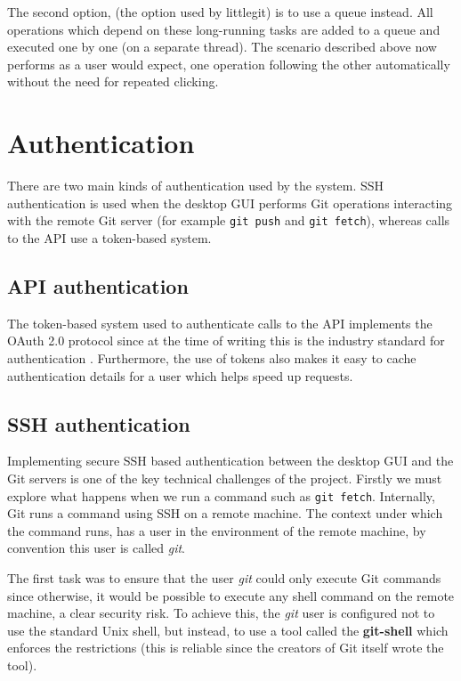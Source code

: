The second option, (the option used by littlegit) is to use a queue instead. All operations which depend on these long-running tasks are added to a queue and executed one by one (on a separate thread). The scenario described above now performs as a user would expect, one operation following the other automatically without the need for repeated clicking.

\section{Authentication}

There are two main kinds of authentication used by the system. SSH authentication is used when the desktop GUI performs Git operations interacting with the remote Git server (for example \texttt{git push} and \texttt{git fetch}), whereas calls to the API use a token-based system. 

\subsection{API authentication}

The token-based system used to authenticate calls to the API implements the OAuth 2.0 protocol since at the time of writing this is the industry standard for authentication \cite{oauth2}. Furthermore, the use of tokens also makes it easy to cache authentication details for a user which helps speed up requests.

\subsection{SSH authentication}

Implementing secure SSH based authentication between the desktop GUI and the Git servers is one of the key technical challenges of the project. Firstly we must explore what happens when we run a command such as \texttt{git fetch}. Internally, Git runs a command using SSH on a remote machine. The context under which the command runs, has a user in the environment of the remote machine, by convention this user is called \emph{git}. 

The first task was to ensure that the user \emph{git} could only execute Git commands since otherwise, it would be possible to execute any shell command on the remote machine, a clear security risk. To achieve this, the \emph{git} user is configured not to use the standard Unix shell, but instead, to use a tool called the \textbf{git-shell} \cite{git-shell} which enforces the restrictions (this is reliable since the creators of Git itself wrote the tool).

